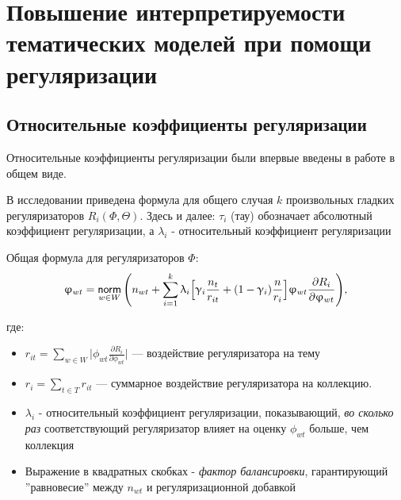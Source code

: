 \chapter{Повышение интерпретируемости тематических моделей при помощи регуляризации}


\section{Относительные коэффициенты регуляризации}



Относительные коэффициенты регуляризации были впервые введены в работе \cite{doykov} в общем виде.

В исследовании \cite{doykov} приведена формула для общего случая $k$ произвольных гладких регуляризаторов $R_i(\Phi, \Theta)$. Здесь и далее: $\tau_i$ (тау) обозначает абсолютный коэффициент регуляризации, а $\lambda_i$ - относительный коэффициент регуляризации

Общая формула для регуляризаторов $\Phi$:
\[
\upvarphi_{wt} = \mathop{\mathsf{norm}}\limits_{w \in W}\Bigg( 
    n_{wt} + \sum_{i=1}^k \uplambda_i \Big[
        \upgamma_i \frac{n_t}{r_{it}} + (1-\upgamma_i)\frac{n}{r_i}
        \Big] 
    \upvarphi_{wt} \frac{\partial R_i}{\partial \upvarphi_{wt}}
\Bigg), \label{rel_phi_general}
\]

где: 
\begin{itemize}
    \item{$r_{it} = \sum_{w\in W} \Big| \phi_{wt} \frac{\partial R_i}{\partial \phi_{wt}} \Big| $ --- воздействие регуляризатора на тему}
    \item { $r_{i} = \sum_{t\in T} r_{it}$ --- суммарное воздействие регуляризатора на коллекцию.}
    \item { $\lambda_i$ - относительный коэффициент регуляризации, показывающий, \emph{во сколько раз} соответствующий регуляризатор влияет на оценку $\phi_{wt}$ больше, чем коллекция}
    \item {Выражение в квадратных скобках - \textit{фактор балансировки}, гарантирующий ''равновесие'' между $n_{wt}$ и регуляризационной добавкой}
\end{itemize}

